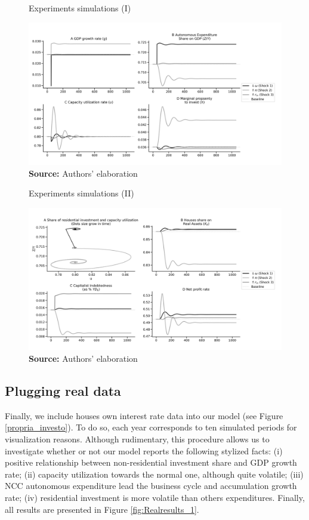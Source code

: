 \documentclass[11pt]{article}
\begin{document}
\begin{figure}[htb]
	\centering
	\caption{Experiments simulations (I)}
	\label{fig:results_1}
	\includegraphics[width=.8\textwidth]{./figs/Compared_Shocks_1.png}
	\caption*{\textbf{Source:} Authors' elaboration}
\end{figure}


\begin{figure}[htb]
	\centering
	\caption{Experiments simulations (II)}
	\label{fig:results_2}
	\includegraphics[width=.8\textwidth]{./figs/Compared_Shocks_2.png}
	\caption*{\textbf{Source:} Authors' elaboration}
\end{figure}


\subsection{Plugging real data}
\label{sec:org6c41235}
\label{real_sim}

Finally, we include houses own interest rate data into our model (see Figure \ref{propria_investo}).
To do so, each year corresponds to ten simulated periods for visualization reasons.
Although rudimentary, this procedure allows us to investigate whether or not our model reports the following stylized facts:
(i) positive relationship between non-residential investment share and GDP growth rate; (ii) capacity utilization towards the normal one, although quite volatile; (iii) NCC autonomous expenditure lead the business cycle and accumulation growth rate; (iv) residential investment is more volatile than others expenditures.
Finally, all results are presented in Figure \ref{fig:Realresults_1}.
\end{document}
